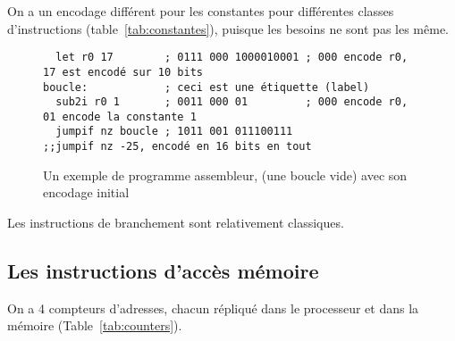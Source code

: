 \documentclass[architecture]{compas2018}
\begin{document}
On a un encodage différent pour les constantes pour différentes classes d'instructions (table~\ref{tab:constantes}), puisque les besoins ne sont pas les même.

\begin{figure}
  \centering
\begin{verbatim}
  let r0 17        ; 0111 000 1000010001 ; 000 encode r0,  17 est encodé sur 10 bits
boucle:	           ; ceci est une étiquette (label)
  sub2i r0 1       ; 0011 000 01         ; 000 encode r0, 01 encode la constante 1
  jumpif nz boucle ; 1011 001 011100111  
;;jumpif nz -25, encodé en 16 bits en tout 
\end{verbatim}
  \caption{Un exemple de programme assembleur, (une boucle vide) avec son encodage initial}
  \label{fig:exempleasm}
\end{figure}


Les instructions de branchement sont relativement classiques.

\iffalse
\subsection{Les instructions de branchement }
\label{sec:jumpcallret}

Soit $a$ l'adresse du premier bit suivant l'instruction \texttt{jump} ou \texttt{call} (i.e. la valeur du PC lorsqu'il a fini de lire l'instruction et ses opérandes).
Soit $d$ la valeur de déplacement (encodée dans une constante de type \textit{addr}, et signée).

L'instruction \texttt{jump} réalise $\mathtt{pc}\leftarrow a + c$.
L'instruction \texttt{jumpif} aussi, mais seulement si la condition est vraie.

La condition  est encodée sur trois bits  selon la table~\ref{tab:conditions} (ARM utilise 4 bits).

L'instruction \texttt{call} copie $\texttt{a}$ dans $r_{7}$, puis réalise $\mathtt{pc} \leftarrow \texttt{d}$
(\emph{addr} est toujours signé).

L'instruction \texttt{return} copie \texttt{r7} dans \texttt{pc}.

\fi

\subsection{Les instructions d'accès mémoire}
\label{sec:mem}



On a 4 compteurs d'adresses, chacun  répliqué dans le processeur et dans la mémoire (Table~\ref{tab:counters}).
\end{document}
